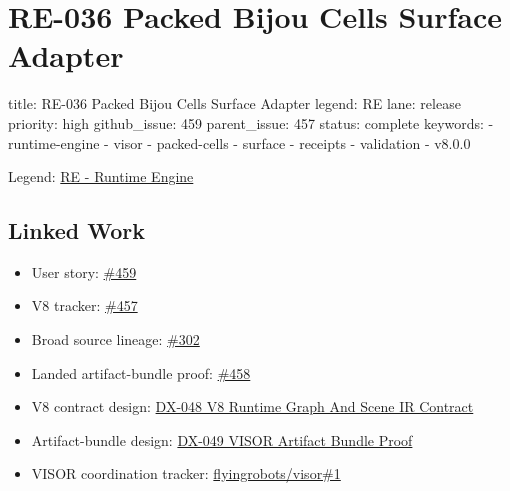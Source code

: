 \chapter{RE-036 Packed Bijou Cells Surface Adapter}\label{record-164}

\smallskip

\begin{RecordMeta}
title: RE-036 Packed Bijou Cells Surface Adapter
legend: RE
lane: release
priority: high
github_issue: 459
parent_issue: 457
status: complete
keywords:
  - runtime-engine
  - visor
  - packed-cells
  - surface
  - receipts
  - validation
  - v8.0.0

\end{RecordMeta}

Legend: \href{https://github.com/flyingrobots/bijou/blob/1853ad902f6bf219326409e7f743a5a1d6517dbc/docs/legends/RE-runtime-engine.md}{RE - Runtime Engine}

\section{Linked Work}\label{record-164-linked-work}

\begin{itemize}
\tightlist
\item
  User story: \href{https://github.com/flyingrobots/bijou/issues/459}{\#459}
\item
  V8 tracker: \href{https://github.com/flyingrobots/bijou/issues/457}{\#457}
\item
  Broad source lineage: \href{https://github.com/flyingrobots/bijou/issues/302}{\#302}
\item
  Landed artifact-bundle proof: \href{https://github.com/flyingrobots/bijou/issues/458}{\#458}
\item
  V8 contract design: \href{https://github.com/flyingrobots/bijou/blob/cbd70612140e7a450d764b3c7be1c6af878b99bc/docs/design/DX-048-v8-runtime-graph-scene-ir-contract.md}{DX-048 V8 Runtime Graph And Scene IR Contract}
\item
  Artifact-bundle design: \href{https://github.com/flyingrobots/bijou/blob/cbd70612140e7a450d764b3c7be1c6af878b99bc/docs/design/DX-049-visor-artifact-bundle-proof.md}{DX-049 VISOR Artifact Bundle Proof}
\item
  VISOR coordination tracker: \href{https://github.com/flyingrobots/visor/issues/1}{flyingrobots/visor\#1}
\end{itemize}

